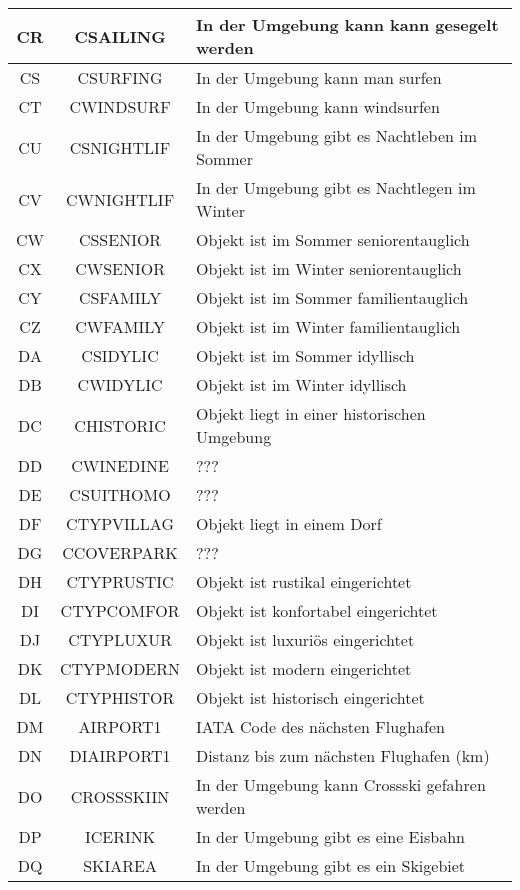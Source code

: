 \begin{longtable}{ | c | c | L{10cm} |}
	CR & CSAILING & In der Umgebung kann kann gesegelt werden \\ \hline 
	CS & CSURFING & In der Umgebung kann man surfen \\ \hline 
	CT & CWINDSURF & In der Umgebung kann windsurfen \\ \hline 
	CU & CSNIGHTLIF & In der Umgebung gibt es Nachtleben im Sommer \\ \hline 
	CV & CWNIGHTLIF & In der Umgebung gibt es Nachtlegen im Winter \\ \hline 
	CW & CSSENIOR & Objekt ist im Sommer seniorentauglich \\ \hline 
	CX & CWSENIOR & Objekt ist im Winter seniorentauglich \\ \hline 
	CY & CSFAMILY & Objekt ist im Sommer familientauglich \\ \hline 
	CZ & CWFAMILY& Objekt ist im Winter familientauglich \\ \hline 
	DA & CSIDYLIC & Objekt ist im Sommer idyllisch \\ \hline 
	DB & CWIDYLIC& Objekt ist im Winter idyllisch \\ \hline 
	DC & CHISTORIC & Objekt liegt in einer historischen Umgebung \\ \hline 
	DD & CWINEDINE & ??? \\ \hline 
	DE & CSUITHOMO & ??? \\ \hline 
	DF & CTYPVILLAG & Objekt liegt in einem Dorf \\ \hline 
	DG & CCOVERPARK & ??? \\ \hline 
	DH & CTYPRUSTIC & Objekt ist rustikal eingerichtet \\ \hline 
	DI & CTYPCOMFOR & Objekt ist konfortabel eingerichtet \\ \hline 
	DJ & CTYPLUXUR & Objekt ist luxuriös eingerichtet \\ \hline 
	DK & CTYPMODERN & Objekt ist modern eingerichtet \\ \hline 
	DL & CTYPHISTOR & Objekt ist historisch eingerichtet \\ \hline 
	DM & AIRPORT1 & IATA Code des nächsten Flughafen \\ \hline 
	DN & DIAIRPORT1 & Distanz bis zum nächsten Flughafen (km) \\ \hline 
	DO & CROSSSKIIN & In der Umgebung kann Crossski gefahren werden \\ \hline 
	DP & ICERINK & In der Umgebung gibt es eine Eisbahn \\ \hline 
	DQ & SKIAREA & In der Umgebung gibt es ein Skigebiet \\ \hline 

\end{longtable}
